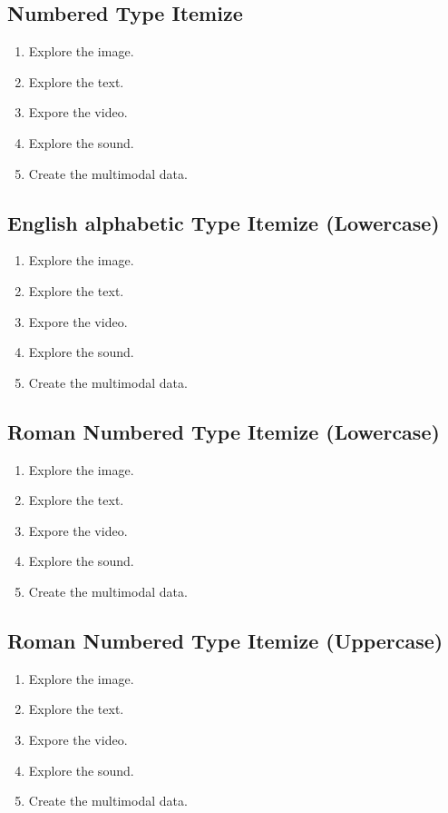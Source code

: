 \documentclass[11pt]{article}
\begin{document}
\subsection{Numbered Type Itemize}
\begin{enumerate}
\item Explore the image.
\item Explore the text.
\item Expore the video.
\item Explore the sound.
\item Create the multimodal data.
\end{enumerate}

\subsection{English alphabetic Type Itemize (Lowercase)}
\begin{enumerate}[A]
\item Explore the image.
\item Explore the text.
\item Expore the video.
\item Explore the sound.
\item Create the multimodal data.
\end{enumerate}


\subsection{Roman Numbered Type Itemize (Lowercase)}
\begin{enumerate}[i]
\item Explore the image.
\item Explore the text.
\item Expore the video.
\item Explore the sound.
\item Create the multimodal data.
\end{enumerate}

\subsection{Roman Numbered Type Itemize (Uppercase)}
\begin{enumerate}[I]
\item Explore the image.
\item Explore the text.
\item Expore the video.
\item Explore the sound.
\item Create the multimodal data.
\end{enumerate}
\end{document}
